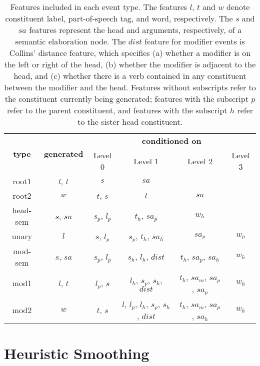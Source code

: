 \documentclass[12pt,letterpaper]{report}
\begin{document}
\begin{table}\centering
\begin{tabular}[h]{|c|c|c|c|c|c|} \hline
  \multirow{2}{*}{{\bf type}} & \multirow{2}{*}{{\bf generated}} & \multicolumn{4}{|c|}{{\bf conditioned on}} \\ \cline{3-6}
  & & Level 0 & Level 1 & Level 2 & Level 3 \\ \hline
  root1 & $l$, $t$ & $s$ & $sa$ & & \\ \hline
  root2 & $w$ & $t$, $s$ & $l$ & $sa$ & \\ \hline
  head-sem & $s$, $sa$ & $s_p$, $l_p$ & $t_h$, $sa_p$ & $w_h$ & \\ \hline
  unary & $l$ & $s$, $l_p$ & $s_p$, $t_h$, $sa_h$ & $sa_p$ &
  $w_p$ \\ \hline
  mod-sem & $s$, $sa$ & $s_p$, $l_p$ & $s_h$, $l_h$, $dist$ & $t_h$, $sa_p$, $sa_h$ & $w_h$ \\ \hline
  mod1 & $l$, $t$ & $l_p$, $s$ & $l_h$, $s_p$, $s_h$, $dist$ & $t_h$, $sa_m$, $sa_p$, $sa_p$ & $w_h$ \\ \hline
  mod2 & $w$ & $t$, $s$ & $l$, $l_p$, $l_h$, $s_p$, $s_h$, $dist$ & $t_h$, $sa_m$, $sa_p$, $sa_h$ & $w_h$ \\ \hline
\end{tabular}
\caption{Features included in each event type.  The features $l$, $t$ and $w$ denote constituent label, part-of-speech tag, and word, respectively.  The $s$ and $sa$ features represent the head and arguments, respectively, of a semantic elaboration node.  The $dist$ feature for modifier events is Collins' distance feature, which specifies (a) whether a modifier is on the left or right of the head, (b) whether the modifier is adjacent to the head, and (c) whether there is a verb contained in any constituent between the modifier and the head.  Features without subscripts refer to the constituent currently being generated; features with the subscript $p$ refer to the parent constituent, and features with the subscript $h$ refer to the sister head constituent.}
\label{tab:event-definitions}
\end{table}

\section{Heuristic Smoothing}
\end{document}
